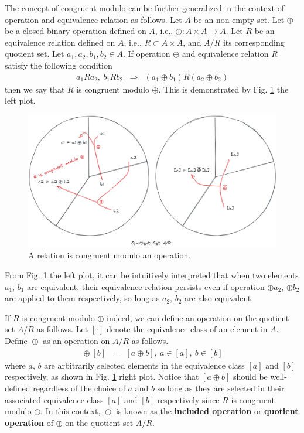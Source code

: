 The concept of congruent modulo can be further generalized in the context of operation and equivalence relation as follows. Let $A$ be an non-empty set. Let $\oplus$ be a closed binary operation defined on $A$, i.e., $\oplus: A\times A \rightarrow A$. Let $R$ be an equivalence relation defined on $A$, i.e., $R\subset A\times A$, and $A/R$ its corresponding quotient set. Let $a_1, a_2, b_1, b_2 \in A$. If operation $\oplus$ and equivalence relation $R$ satisfy the following condition
\begin{eqnarray}
	a_1Ra_2, ~b_1Rb_2 &\Rightarrow& (a_1\oplus b_1)R(a_2\oplus b_2) \label{eq:relation_congruent_modulo_operation}
\end{eqnarray}
then we say that $R$ is congruent modulo $\oplus$. This is demonstrated by Fig. \ref{fig:congruent_modulo_relation} the left plot.
\begin{figure}[htbp]
	\centering
	\includegraphics[width=350pt]{chapters/abstract-algebra-basics/figures/congruent_modulo_relation.png}
	\caption{A relation is congruent modulo an operation.} \label{fig:congruent_modulo_relation}
\end{figure}
From Fig. \ref{fig:congruent_modulo_relation} the left plot, it can be intuitively interpreted that when two elements $a_1$, $b_1$ are equivalent, their equivalence relation persists even if operation $\oplus a_2$, $\oplus b_2$ are applied to them respectively, so long as $a_2$, $b_2$ are also equivalent.

If $R$ is congruent modulo $\oplus$ indeed, we can define an operation on the quotient set $A/R$ as follows. Let $[\cdot]$ denote the equivalence class of an element in $A$. Define $\bar{\oplus}$ as an operation on $A/R$ as follows.
\begin{eqnarray}
	[a] \bar{\oplus} [b] &=& [a\oplus b], ~a\in[a], ~b\in [b] \label{eq:quotient_set_operation}
\end{eqnarray}
where $a$, $b$ are arbitrarily selected elements in the equivalence class $[a]$ and $[b]$ respectively, as shown in Fig. \ref{fig:congruent_modulo_relation} right plot. Notice that $[a\oplus b]$ should be well-defined regardless of the choice of $a$ and $b$ so long as they are selected in their associated equivalence class $[a]$ and $[b]$ respectively since $R$ is congruent modulo $\oplus$. In this context, $\bar{\oplus}$ is known as the \textbf{included operation} or \textbf{quotient operation} of $\oplus$ on the quotient set $A/R$.

